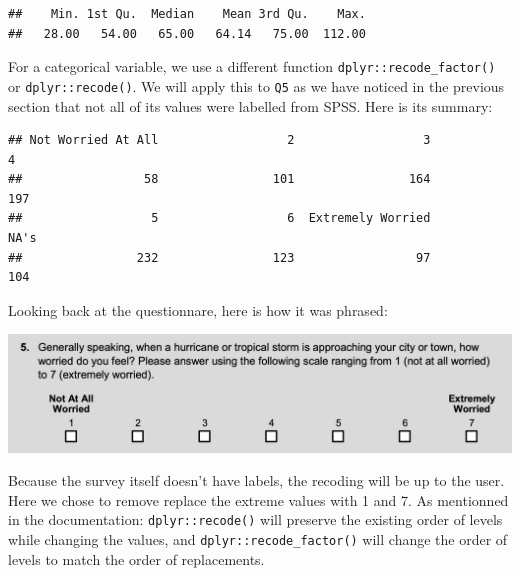 \documentclass[
]{book}
\newenvironment{Shaded}{\begin{snugshade}}{\end{snugshade}}
\newcommand{\CommentTok}[1]{\textcolor[rgb]{0.56,0.35,0.01}{\textit{#1}}}
\newcommand{\DataTypeTok}[1]{\textcolor[rgb]{0.13,0.29,0.53}{#1}}
\newcommand{\KeywordTok}[1]{\textcolor[rgb]{0.13,0.29,0.53}{\textbf{#1}}}
\newcommand{\NormalTok}[1]{#1}
\newcommand{\OperatorTok}[1]{\textcolor[rgb]{0.81,0.36,0.00}{\textbf{#1}}}
\newcommand{\StringTok}[1]{\textcolor[rgb]{0.31,0.60,0.02}{#1}}
\begin{document}
\begin{Shaded}
\end{Shaded}

\begin{verbatim}
##    Min. 1st Qu.  Median    Mean 3rd Qu.    Max. 
##   28.00   54.00   65.00   64.14   75.00  112.00
\end{verbatim}

For a categorical variable, we use a different function \texttt{dplyr::recode\_factor()} or \texttt{dplyr::recode()}. We will apply this to \texttt{Q5} as we have noticed in the previous section that not all of its values were labelled from SPSS. Here is its summary:

\begin{verbatim}
## Not Worried At All                  2                  3                  4 
##                 58                101                164                197 
##                  5                  6  Extremely Worried               NA's 
##                232                123                 97                104
\end{verbatim}

Looking back at the questionnare, here is how it was phrased:

\includegraphics{images/q5.png}

Because the survey itself doesn't have labels, the recoding will be up to the user. Here we chose to remove replace the extreme values with 1 and 7. As mentionned in the documentation: \texttt{dplyr::recode()} will preserve the existing order of levels while changing the values, and \texttt{dplyr::recode\_factor()} will change the order of levels to match the order of replacements.

\begin{Shaded}
\end{Shaded}
\end{document}
